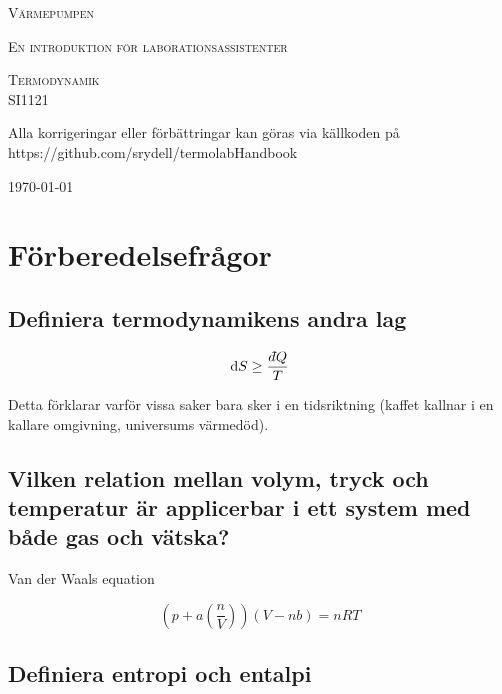 \documentclass[11pt]{article}
\newcommand{\dbar}{d\hspace*{-0.08em}\bar{}\hspace*{0.1em}}
\begin{document}
\begin{titlepage}
	\centering
	{\scshape\LARGE Värmepumpen \par}
	{\scshape En introduktion för laborationsassistenter \par}
	\vspace{4cm}
	{\scshape\Large Termodynamik \\ SI1121\par}
	\vspace{10cm}
	{ Alla korrigeringar eller förbättringar kan göras via källkoden på \\ https://github.com/srydell/termolabHandbook\par}
	\vfill
	{\large \today\par}
\end{titlepage}

\section{Förberedelsefrågor}

\subsection{Definiera termodynamikens andra lag}

\begin{equation}
    \mathrm{d}S \geq \frac{\dbar Q}{T}
\end{equation}

Detta förklarar varför vissa saker bara sker i en tidsriktning (kaffet kallnar i en kallare omgivning, universums värmedöd).

\subsection{Vilken relation mellan volym, tryck och temperatur är applicerbar i ett system med både gas och vätska?}

Van der Waals equation

\begin{equation}
    \left ( p + a \left ( \frac{n}{V} \right ) \right ) (V - nb) = nRT
\end{equation}


\subsection{Definiera entropi och entalpi}
\end{document}
